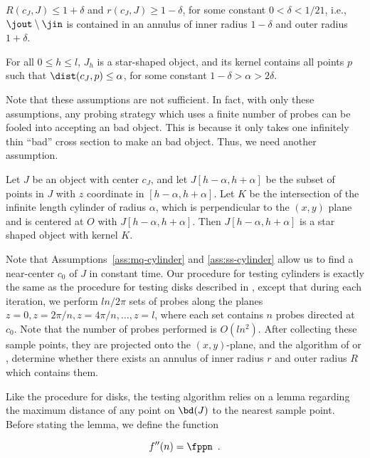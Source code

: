 {\begin{ass}
$R(c_J,J)\le 1+\delta$ and $r(c_J,J)\ge 1-\delta$, for some constant
$0<\delta<1/21$, i.e., $\jout\setminus\jin$ is contained
in an annulus of inner radius $1-\delta$ and outer radius $1+\delta$.
\end{ass}

\begin{ass}
For all $0\le h\le l$, $J_h$ is a star-shaped object, and its kernel
contains all points $p$ such that $\dist(c_J,p)\le\alpha$, for some
constant $1-\delta>\alpha>2\delta$.
\end{ass}

Note that these assumptions are not sufficient.  In fact, with only
these assumptions, any probing strategy which uses a finite number of
probes can be fooled into accepting an bad object.  This is because it
only takes one infinitely thin ``bad'' cross section to make an bad
object.  Thus, we need another assumption.

\begin{ass}
Let $J$ be an object with center $c_J$, and let $J[h-\alpha,h+\alpha]$
be the subset of points in $J$ with $z$ coordinate in
$[h-\alpha,h+\alpha]$.  Let $K$ be the intersection of the infinite
length cylinder of radius $\alpha$, which is perpendicular to the
$(x,y)$ plane and is centered at $O$ with $J[h-\alpha,h+\alpha]$.
Then $J[h-\alpha,h+\alpha]$ is a star shaped object with kernel $K$.
\end{ass}

Note that Assumptions~\ref{ass:mq-cylinder} and \ref{ass:ss-cylinder}
allow us to find a near-center $c_0$ of $J$ in constant time.  Our
procedure for testing cylinders is exactly the same as the procedure
for testing disks described in , except that during
each iteration, we perform $ln/2\pi$ sets of probes along the planes
$z=0, z=2\pi/n, z=4\pi/n,\ldots,z=l$, where each set contains $n$
probes directed at $c_0$. Note that the number of probes performed is
$O(ln^2)$. After collecting these sample points, they are projected
onto the $(x,y)$-plane, and the algorithm of \cite{bbbrw97} or
\cite{dgr97}, determine whether there exists an annulus of inner
radius $r$ and outer radius $R$ which contains them.

Like the procedure for disks, the testing algorithm relies on a
lemma regarding the maximum distance of any point on $\bd(J)$ to the
nearest sample point.  Before stating the lemma, we define the
function}
\begin{equation} 
f''(n) = \fppn \enspace . 
\end{equation}

